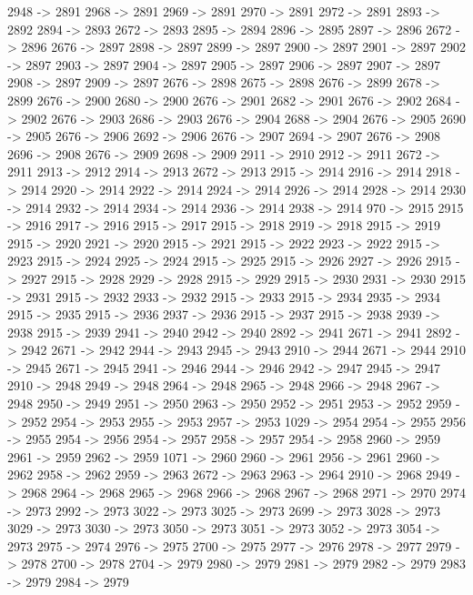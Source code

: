 {	2948 -> 2891
	2968 -> 2891
	2969 -> 2891
	2970 -> 2891
	2972 -> 2891
	2893 -> 2892
	2894 -> 2893
	2672 -> 2893
	2895 -> 2894
	2896 -> 2895
	2897 -> 2896
	2672 -> 2896
	2676 -> 2897
	2898 -> 2897
	2899 -> 2897
	2900 -> 2897
	2901 -> 2897
	2902 -> 2897
	2903 -> 2897
	2904 -> 2897
	2905 -> 2897
	2906 -> 2897
	2907 -> 2897
	2908 -> 2897
	2909 -> 2897
	2676 -> 2898
	2675 -> 2898
	2676 -> 2899
	2678 -> 2899
	2676 -> 2900
	2680 -> 2900
	2676 -> 2901
	2682 -> 2901
	2676 -> 2902
	2684 -> 2902
	2676 -> 2903
	2686 -> 2903
	2676 -> 2904
	2688 -> 2904
	2676 -> 2905
	2690 -> 2905
	2676 -> 2906
	2692 -> 2906
	2676 -> 2907
	2694 -> 2907
	2676 -> 2908
	2696 -> 2908
	2676 -> 2909
	2698 -> 2909
	2911 -> 2910
	2912 -> 2911
	2672 -> 2911
	2913 -> 2912
	2914 -> 2913
	2672 -> 2913
	2915 -> 2914
	2916 -> 2914
	2918 -> 2914
	2920 -> 2914
	2922 -> 2914
	2924 -> 2914
	2926 -> 2914
	2928 -> 2914
	2930 -> 2914
	2932 -> 2914
	2934 -> 2914
	2936 -> 2914
	2938 -> 2914
	970 -> 2915
	2915 -> 2916
	2917 -> 2916
	2915 -> 2917
	2915 -> 2918
	2919 -> 2918
	2915 -> 2919
	2915 -> 2920
	2921 -> 2920
	2915 -> 2921
	2915 -> 2922
	2923 -> 2922
	2915 -> 2923
	2915 -> 2924
	2925 -> 2924
	2915 -> 2925
	2915 -> 2926
	2927 -> 2926
	2915 -> 2927
	2915 -> 2928
	2929 -> 2928
	2915 -> 2929
	2915 -> 2930
	2931 -> 2930
	2915 -> 2931
	2915 -> 2932
	2933 -> 2932
	2915 -> 2933
	2915 -> 2934
	2935 -> 2934
	2915 -> 2935
	2915 -> 2936
	2937 -> 2936
	2915 -> 2937
	2915 -> 2938
	2939 -> 2938
	2915 -> 2939
	2941 -> 2940
	2942 -> 2940
	2892 -> 2941
	2671 -> 2941
	2892 -> 2942
	2671 -> 2942
	2944 -> 2943
	2945 -> 2943
	2910 -> 2944
	2671 -> 2944
	2910 -> 2945
	2671 -> 2945
	2941 -> 2946
	2944 -> 2946
	2942 -> 2947
	2945 -> 2947
	2910 -> 2948
	2949 -> 2948
	2964 -> 2948
	2965 -> 2948
	2966 -> 2948
	2967 -> 2948
	2950 -> 2949
	2951 -> 2950
	2963 -> 2950
	2952 -> 2951
	2953 -> 2952
	2959 -> 2952
	2954 -> 2953
	2955 -> 2953
	2957 -> 2953
	1029 -> 2954
	2954 -> 2955
	2956 -> 2955
	2954 -> 2956
	2954 -> 2957
	2958 -> 2957
	2954 -> 2958
	2960 -> 2959
	2961 -> 2959
	2962 -> 2959
	1071 -> 2960
	2960 -> 2961
	2956 -> 2961
	2960 -> 2962
	2958 -> 2962
	2959 -> 2963
	2672 -> 2963
	2963 -> 2964
	2910 -> 2968
	2949 -> 2968
	2964 -> 2968
	2965 -> 2968
	2966 -> 2968
	2967 -> 2968
	2971 -> 2970
	2974 -> 2973
	2992 -> 2973
	3022 -> 2973
	3025 -> 2973
	2699 -> 2973
	3028 -> 2973
	3029 -> 2973
	3030 -> 2973
	3050 -> 2973
	3051 -> 2973
	3052 -> 2973
	3054 -> 2973
	2975 -> 2974
	2976 -> 2975
	2700 -> 2975
	2977 -> 2976
	2978 -> 2977
	2979 -> 2978
	2700 -> 2978
	2704 -> 2979
	2980 -> 2979
	2981 -> 2979
	2982 -> 2979
	2983 -> 2979
	2984 -> 2979
}

